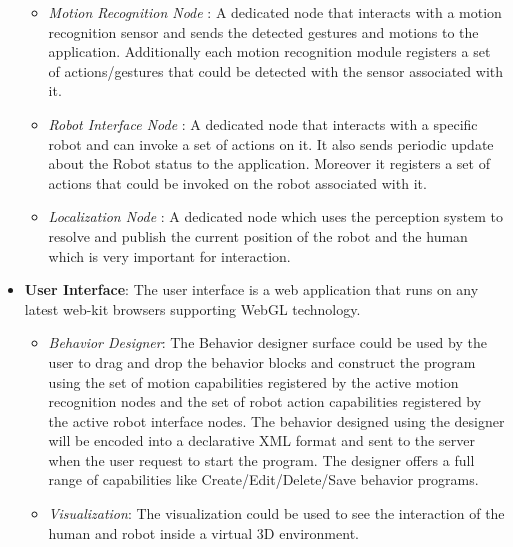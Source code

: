 \documentclass{llncs}
\begin{document}
\begin{itemize}
\begin{itemize}
\item \emph{Motion Recognition Node} : A dedicated node that interacts with a motion recognition sensor and sends the detected gestures and motions to the application. Additionally each motion recognition module registers a set of actions/gestures that could be detected with the sensor associated with it.
\item \emph{Robot Interface Node} : A dedicated node that interacts with a specific robot and can invoke a set of actions on it. It also sends periodic update about the Robot status to the application. Moreover it registers a set of actions that could be invoked on the robot associated with it.
\item \emph{Localization Node} : A dedicated node which uses the perception system to resolve and publish the current position of the robot and the human which is very important for interaction.
\end{itemize}
\item \textbf{User Interface}: The user interface is a web application that runs on any latest web-kit browsers supporting WebGL technology. 
\begin{itemize}
\item \emph{Behavior Designer}: The Behavior designer surface could be used by the user to drag and drop the behavior blocks and construct the program using the set of motion capabilities registered by the active motion recognition nodes and the set of robot action capabilities registered by the active robot interface nodes. The behavior designed using the designer will be encoded into a declarative XML format and sent to the server when the user request to start the program. The designer offers a full range of capabilities like Create/Edit/Delete/Save behavior programs.
\item \emph{Visualization}: The visualization could be used to see the interaction of the human and robot inside a virtual 3D environment.
\end{itemize}
\end{itemize}
\end{document}
